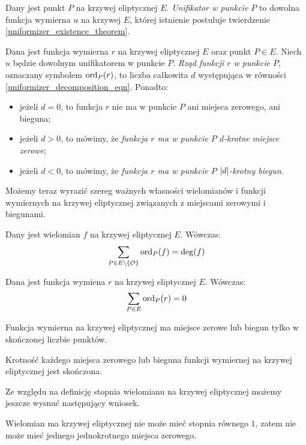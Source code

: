 \begin{definition}
Dany jest punkt $P$ na krzywej eliptycznej $E$.
\emph{Unifikator w punkcie $P$}
to dowolna funkcja wymierna $u$ na krzywej $E$,
której istnienie postuluje twierdzenie \ref{uniformizer_existence_theorem}.
\end{definition}

\begin{definition}
Dana jest funkcja wymierna $r$ na krzywej eliptycznej $E$
oraz punkt $P \in E$.
Niech $u$ będzie dowolnym unifikatorem w punkcie $P$.
\emph{Rząd funkcji $r$ w punkcie $P$},
oznaczany symbolem $\operatorname{ord}_P(r)$,
to liczba całkowita $d$
występująca w równości \ref{uniformizer_decomposition_eqn}.
Ponadto:
\begin{itemize}
\item jeżeli $d = 0$,
to funkcja $r$ nie ma w punkcie $P$ ani miejsca zerowego, ani bieguna;
\item jeżeli $d > 0$, to mówimy,
że \emph{funkcja $r$ ma w punkcie $P$ $d$-krotne miejsce zerowe};
\item jeżeli $d < 0$, to mówimy,
że \emph{funkcja $r$ ma w punkcie $P$ $\lvert d\rvert$-krotny biegun}.
\end{itemize}
\end{definition}

Możemy teraz wyrazić szereg ważnych własności
wielomianów i funkcji wymiernych na krzywej eliptycznej
związanych z miejscami zerowymi i biegunami.

\begin{theorem}\label{polynomial_ord_deg_theorem}
Dany jest wielomian $f$ na krzywej eliptycznej $E$.
Wówczas:
\begin{equation*}
\sum_{P \in E\setminus \{\mathcal{O}\}} \operatorname{ord}_P(f) = \deg(f)
\end{equation*}
\end{theorem}

\begin{corollary}\label{function_order_sum_zero_corollary}
Dana jest funkcja wymiena $r$ na krzywej eliptycznej $E$.
Wówczas:
\begin{equation*}
\sum_{P \in E} \operatorname{ord}_P(r) = 0
\end{equation*}
\end{corollary}

\begin{corollary}
Funkcja wymierna na krzywej eliptycznej ma miejsce zerowe lub biegun
tylko w skończonej liczbie punktów.
\end{corollary}

\begin{corollary}
Krotność każdego miejsca zerowego lub bieguna
funkcji wymiernej na krzywej eliptycznej
jest skończona.
\end{corollary}

Ze względu na definicję stopnia wielomianu na krzywej eliptycznej
możemy jeszcze wysnuć następujący wniosek.

\begin{corollary}\label{poly_no_single_zero_corollary}
Wielomian ma krzywej eliptycznej nie może mieć stopnia równego $1$,
zatem nie może mieć jednego jednokrotnego miejsca zerowego.
\end{corollary}

